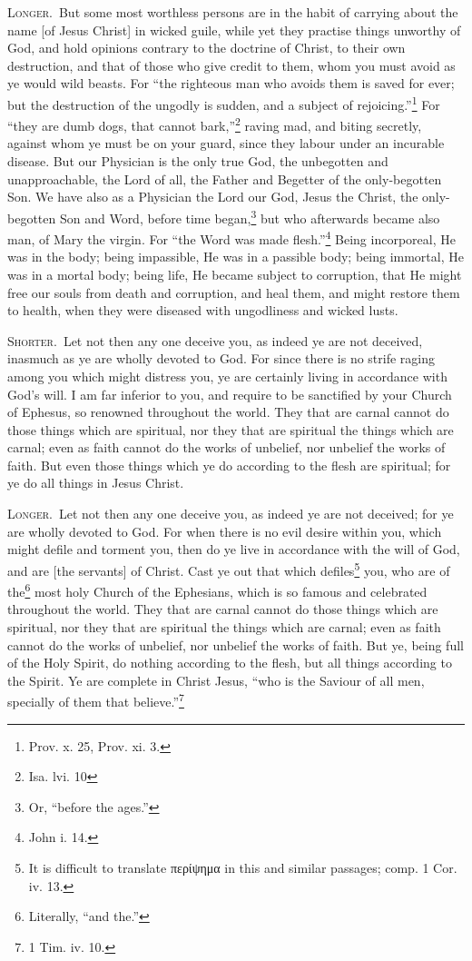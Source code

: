 \textsc{Longer.}~But some most worthless persons are in the habit of carrying about the name [of Jesus Christ] in wicked guile, while yet they practise things unworthy of God, and hold opinions contrary to the doctrine of Christ, to their own destruction, and that of those who give credit to them, whom you must avoid as ye would wild beasts. For “the righteous man who avoids them is saved for ever; but the destruction of the ungodly is sudden, and a subject of rejoicing.”\footnote{Prov. x. 25, Prov. xi. 3.} For “they are dumb dogs, that cannot bark,”\footnote{Isa. lvi. 10} raving mad, and biting secretly, against whom ye must be on your guard, since they labour under an incurable disease. But our Physician is the only true God, the unbegotten and unapproachable, the Lord of all, the Father and Begetter of the only-begotten Son. We have also as a Physician the Lord our God, Jesus the Christ, the only-begotten Son and Word, before time began,\footnote{Or, “before the ages.”} but who afterwards became also man, of Mary the virgin. For “the Word was made flesh.”\footnote{John i. 14.} Being incorporeal, He was in the body; being impassible, He was in a passible body; being immortal, He was in a mortal body; being life, He became subject to corruption, that He might free our souls from death and corruption, and heal them, and might restore them to health, when they were diseased with ungodliness and wicked lusts.


\textsc{Shorter.}~Let not then any one deceive you, as indeed ye are not deceived, inasmuch as ye are wholly devoted to God. For since there is no strife raging among you which might distress you, ye are certainly living in accordance with God’s will. I am far inferior to you, and require to be sanctified by your Church of Ephesus, so renowned throughout the world. They that are carnal cannot do those things which are spiritual, nor they that are spiritual the things which are carnal; even as faith cannot do the works of unbelief,  nor unbelief the works of faith. But even those things which ye do according to the flesh are spiritual; for ye do all things in Jesus Christ.

\textsc{Longer.}~Let not then any one deceive you, as indeed ye are not deceived; for ye are wholly devoted to God. For when there is no evil desire within you, which might defile and torment you, then do ye live in accordance with the will of God, and are [the servants] of Christ. Cast ye out that which defiles\footnote{It is difficult to translate \textgreek{περίψημα} in this and similar passages; comp. 1 Cor. iv. 13.} you, who are of the\footnote{Literally, “and the.”} most holy Church of the Ephesians, which is so famous and celebrated throughout the world. They that are carnal cannot do those things which are spiritual, nor they that are spiritual the things which are carnal; even as faith cannot do the works of unbelief, nor unbelief the works of faith. But ye, being full of the Holy Spirit, do nothing according to the flesh, but all things according to the Spirit. Ye are complete in Christ Jesus, “who is the Saviour of all men, specially of them that believe.”\footnote{1 Tim. iv. 10.}

